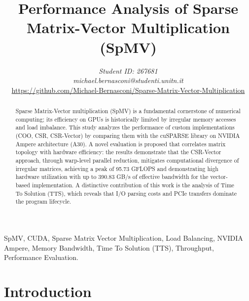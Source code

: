 \documentclass[conference]{IEEEtran}
\begin{document}
\title{Performance Analysis of Sparse Matrix-Vector Multiplication (SpMV)}


\author{
\textit{Student ID: 267681}\\
\textit{michael.bernasconi@studenti.unitn.it} \\
\url{https://github.com/Michael-Bernasconi/Sparse-Matrix-Vector-Multiplication}
}


\maketitle


\begin{abstract}

Sparse Matrix-Vector multiplication (SpMV) is a fundamental cornerstone of numerical computing; its efficiency on GPUs is historically limited by irregular memory accesses and load imbalance. This study analyzes the performance of custom implementations (COO, CSR, CSR-Vector) by comparing them with the cuSPARSE library on NVIDIA Ampere architecture (A30). A novel evaluation is proposed that correlates matrix topology with hardware efficiency: the results demonstrate that the CSR-Vector approach, through warp-level parallel reduction, mitigates computational divergence of irregular matrices, achieving a peak of 95.73 GFLOPS and demonstrating high hardware utilization with up to 390.83 GB/s of effective bandwidth for the vector-based implementation. A distinctive contribution of this work is the analysis of Time To Solution (TTS), which reveals that I/O parsing costs and PCIe transfers dominate the program lifecycle.
\end{abstract}


\begin{IEEEkeywords}

SpMV, CUDA, Sparse Matrix Vector Multiplication, Load Balancing, NVIDIA Ampere, Memory Bandwidth, Time To Solution (TTS), Throughput, Performance Evaluation.

\end{IEEEkeywords}


\section{Introduction}
\end{document}
